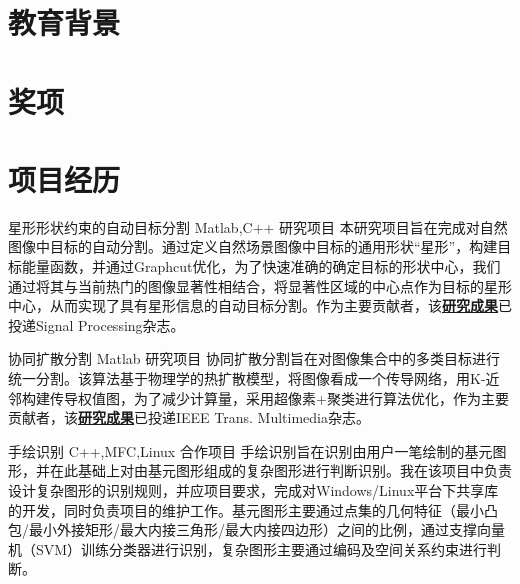 \documentclass[11pt,a4paper,sans]{moderncv}   %
\title{}                     %
\begin{document}
\begin{CJK}{UTF8}{gbsn}                       %
\maketitle

\section{教育背景}

\section{奖项}

\section{项目经历}
\renewcommand{\baselinestretch}{1.2}

{星形形状约束的自动目标分割}
{Matlab,C++}
{研究项目}{}
{本研究项目旨在完成对自然图像中目标的自动分割。通过定义自然场景图像中目标的通用形状“星形”，构建目标能量函数，并通过Graphcut优化，为了快速准确的确定目标的形状中心，我们通过将其与当前热门的图像显著性相结合，将显著性区域的中心点作为目标的星形中心，从而实现了具有星形信息的自动目标分割。作为主要贡献者，该\textbf{\href{http://files.cnblogs.com/moondark/XiangliLiao_SRAPC.pdf}{研究成果}}已投递Signal Processing杂志。}
\vspace*{0.2\baselineskip}

{协同扩散分割}
{Matlab}
{研究项目}{}
{协同扩散分割旨在对图像集合中的多类目标进行统一分割。该算法基于物理学的热扩散模型，将图像看成一个传导网络，用K-近邻构建传导权值图，为了减少计算量，采用超像素+聚类进行算法优化，作为主要贡献者，该\textbf{\href{http://files.cnblogs.com/moondark/XiangliLiao_CoDiffusion.pdf}{研究成果}}已投递IEEE Trans. Multimedia杂志。}
\vspace*{0.2\baselineskip}

{手绘识别}
{C++,MFC,Linux}
{合作项目}{}
{手绘识别旨在识别由用户一笔绘制的基元图形，并在此基础上对由基元图形组成的复杂图形进行判断识别。我在该项目中负责设计复杂图形的识别规则，并应项目要求，完成对Windows/Linux平台下共享库的开发，同时负责项目的维护工作。基元图形主要通过点集的几何特征（最小凸包/最小外接矩形/最大内接三角形/最大内接四边形）之间的比例，通过支撑向量机（SVM）训练分类器进行识别，复杂图形主要通过编码及空间关系约束进行判断。}
\vspace*{0.2\baselineskip}


\end{CJK}
\end{document}
